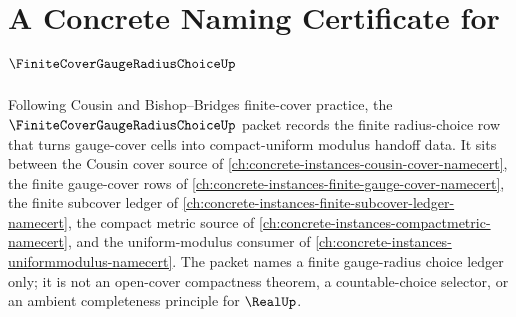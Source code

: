 \chapter{A Concrete Naming Certificate for $\FiniteCoverGaugeRadiusChoiceUp$}
\label{ch:concrete-instances-finite-cover-gauge-radius-choice-namecert}

Following Cousin and Bishop--Bridges finite-cover practice, the $\FiniteCoverGaugeRadiusChoiceUp$ packet records the finite radius-choice row that turns gauge-cover cells into compact-uniform modulus handoff data. It sits between the Cousin cover source of \autoref{ch:concrete-instances-cousin-cover-namecert}, the finite gauge-cover rows of \autoref{ch:concrete-instances-finite-gauge-cover-namecert}, the finite subcover ledger of \autoref{ch:concrete-instances-finite-subcover-ledger-namecert}, the compact metric source of \autoref{ch:concrete-instances-compactmetric-namecert}, and the uniform-modulus consumer of \autoref{ch:concrete-instances-uniformmodulus-namecert}. The packet names a finite gauge-radius choice ledger only; it is not an open-cover compactness theorem, a countable-choice selector, or an ambient completeness principle for $\RealUp$.

